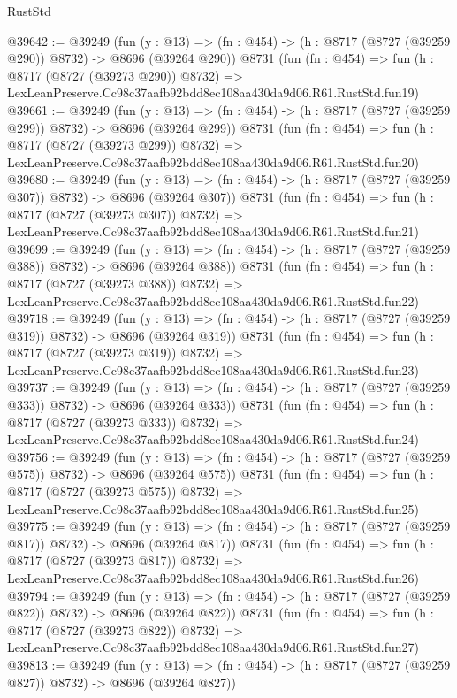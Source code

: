 \begin{lexlean}{RustStd}
\begin{coremodule}
@39642 := @39249
    (fun (y : @13) => (fn : @454) -> (h : @8717 (@8727 (@39259 @290)) @8732) -> @8696 (@39264 @290))
    @8731
    (fun (fn : @454) =>
    fun (h : @8717 (@8727 (@39273 @290)) @8732) =>
    LexLeanPreserve.Cc98c37aafb92bdd8ec108aa430da9d06.R61.RustStd.fun19)
@39661 := @39249
    (fun (y : @13) => (fn : @454) -> (h : @8717 (@8727 (@39259 @299)) @8732) -> @8696 (@39264 @299))
    @8731
    (fun (fn : @454) =>
    fun (h : @8717 (@8727 (@39273 @299)) @8732) =>
    LexLeanPreserve.Cc98c37aafb92bdd8ec108aa430da9d06.R61.RustStd.fun20)
@39680 := @39249
    (fun (y : @13) => (fn : @454) -> (h : @8717 (@8727 (@39259 @307)) @8732) -> @8696 (@39264 @307))
    @8731
    (fun (fn : @454) =>
    fun (h : @8717 (@8727 (@39273 @307)) @8732) =>
    LexLeanPreserve.Cc98c37aafb92bdd8ec108aa430da9d06.R61.RustStd.fun21)
@39699 := @39249
    (fun (y : @13) => (fn : @454) -> (h : @8717 (@8727 (@39259 @388)) @8732) -> @8696 (@39264 @388))
    @8731
    (fun (fn : @454) =>
    fun (h : @8717 (@8727 (@39273 @388)) @8732) =>
    LexLeanPreserve.Cc98c37aafb92bdd8ec108aa430da9d06.R61.RustStd.fun22)
@39718 := @39249
    (fun (y : @13) => (fn : @454) -> (h : @8717 (@8727 (@39259 @319)) @8732) -> @8696 (@39264 @319))
    @8731
    (fun (fn : @454) =>
    fun (h : @8717 (@8727 (@39273 @319)) @8732) =>
    LexLeanPreserve.Cc98c37aafb92bdd8ec108aa430da9d06.R61.RustStd.fun23)
@39737 := @39249
    (fun (y : @13) => (fn : @454) -> (h : @8717 (@8727 (@39259 @333)) @8732) -> @8696 (@39264 @333))
    @8731
    (fun (fn : @454) =>
    fun (h : @8717 (@8727 (@39273 @333)) @8732) =>
    LexLeanPreserve.Cc98c37aafb92bdd8ec108aa430da9d06.R61.RustStd.fun24)
@39756 := @39249
    (fun (y : @13) => (fn : @454) -> (h : @8717 (@8727 (@39259 @575)) @8732) -> @8696 (@39264 @575))
    @8731
    (fun (fn : @454) =>
    fun (h : @8717 (@8727 (@39273 @575)) @8732) =>
    LexLeanPreserve.Cc98c37aafb92bdd8ec108aa430da9d06.R61.RustStd.fun25)
@39775 := @39249
    (fun (y : @13) => (fn : @454) -> (h : @8717 (@8727 (@39259 @817)) @8732) -> @8696 (@39264 @817))
    @8731
    (fun (fn : @454) =>
    fun (h : @8717 (@8727 (@39273 @817)) @8732) =>
    LexLeanPreserve.Cc98c37aafb92bdd8ec108aa430da9d06.R61.RustStd.fun26)
@39794 := @39249
    (fun (y : @13) => (fn : @454) -> (h : @8717 (@8727 (@39259 @822)) @8732) -> @8696 (@39264 @822))
    @8731
    (fun (fn : @454) =>
    fun (h : @8717 (@8727 (@39273 @822)) @8732) =>
    LexLeanPreserve.Cc98c37aafb92bdd8ec108aa430da9d06.R61.RustStd.fun27)
@39813 := @39249
    (fun (y : @13) => (fn : @454) -> (h : @8717 (@8727 (@39259 @827)) @8732) -> @8696 (@39264 @827))

\end{coremodule}
\end{lexlean}
